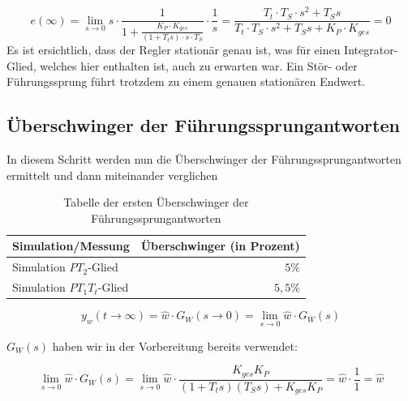 \documentclass{report}
\begin{document}
\begin{equation}
  \label{eq:4}
  e(\infty) = \lim_{s\to 0} s \cdot \frac{1}{1+\frac{K_{P}\cdot K_{ges}}{(1+T_{t}s)\cdot s \cdot T_{S}}} \cdot\frac{1}{s} = \frac{T_{t}\cdot T_{S} \cdot s^{2} + T_{S}s}{T_{t}\cdot T_{S} \cdot s^{2} + T_{S}s+K_{P}\cdot K_{ges}} = 0
\end{equation}
Es ist ersichtlich, dass der Regler stationär genau ist, was für einen Integrator-Glied, welches hier enthalten ist, auch zu erwarten war. Ein Stör- oder Führungssprung führt trotzdem zu einem genauen stationären Endwert.

\newpage

\subsection{Überschwinger der Führungssprungantworten}

In diesem Schritt werden nun die Überschwinger der Führungssprungantworten ermittelt und dann miteinander verglichen

\begin{table}[h]
  \centering
  \begin{tabular}{lr}
    \hline
    Simulation/Messung & Überschwinger (in Prozent) \\
    \hline
    Simulation $PT_{2}$-Glied & $5\%$ \\
    Simulation $PT_{1}T_{t}$-Glied & $5,5\%$ \\
    \hline
  \end{tabular}
  \caption{Tabelle der ersten Überschwinger der Führungssprungantworten}
  \label{tab:lead}
\end{table}

\begin{equation}
  \label{eq:5}
  y_{w}(t\to\infty) = \hat{w}\cdot G_{W}(s\to 0) = \lim_{s\to 0} \hat{w} \cdot G_{W}(s)
\end{equation}

$G_{W}(s)$ haben wir in der Vorbereitung bereits verwendet:

\begin{equation*}
  \lim_{s\to 0} \hat{w} \cdot G_{W}(s) = \lim_{s\to 0} \hat{w} \cdot \frac{K_{ges}K_{P}}{(1+T_{t}s)(T_{S}s)+K_{ges}K_{P}} = \hat{w}\cdot\frac{1}{1} = \hat{w}
\end{equation*}
\end{document}
